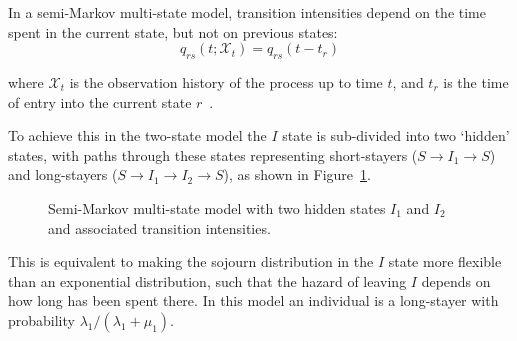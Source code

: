 In a semi-Markov multi-state model, transition intensities depend on the time spent in the current state, but not on previous states:
%
\[
    q_{rs}(t; \mathcal{X}_t) = q_{rs}(t - t_r)
\]

where $\mathcal{X}_t$ is the observation history of the process up to time $t$, and $t_r$ is the time of entry into the current state $r$~\parencite{Jackson2011-ry}.

To achieve this in the two-state model the $I$ state is sub-divided into two `hidden' states, with paths through these states representing short-stayers ($S \rightarrow I_1 \rightarrow S$) and long-stayers ($S \rightarrow I_1 \rightarrow I_2 \rightarrow S$), as shown in Figure~\ref{fig:semi-markov-model}.

\begin{figure}[htbp!]
    \centering
    \caption[Semi-Markov multi-state model with two hidden states]{Semi-Markov multi-state model with two hidden states $I_1$ and $I_2$ and associated transition intensities.}\label{fig:semi-markov-model}
\end{figure}

This is equivalent to making the sojourn distribution in the $I$ state more flexible than an exponential distribution, such that the hazard of leaving $I$ depends on how long has been spent there. In this model an individual is a long-stayer with probability ${\lambda_1}/{(\lambda_1 + \mu_1)}$.



